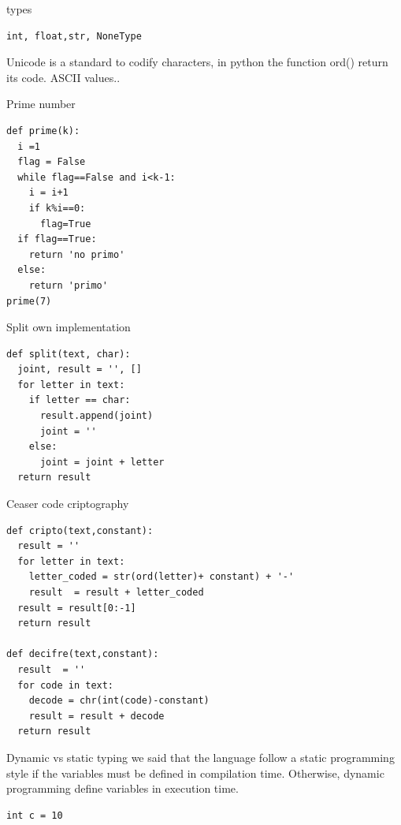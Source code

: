 \documentclass{beamer}
\begin{document}
\begin{frame}[fragile]
types
\begin{lstlisting}
int, float,str, NoneType
\end{lstlisting}
\end{frame}





\begin{frame}{Unicode}
is a standard to codify characters, 
in python the function ord() return its code.
ASCII values..
\end{frame}






\begin{frame}[fragile]{Prime number}
\begin{lstlisting}
def prime(k):
  i =1
  flag = False
  while flag==False and i<k-1:
    i = i+1
    if k%i==0:
      flag=True
  if flag==True:
    return 'no primo'
  else:
    return 'primo'
prime(7)
\end{lstlisting}
\end{frame}


\begin{frame}[fragile]{Split own implementation}
\begin{lstlisting}
def split(text, char):
  joint, result = '', []
  for letter in text:
    if letter == char:
      result.append(joint)
      joint = ''
    else:
      joint = joint + letter
  return result
\end{lstlisting}
\end{frame}






\begin{frame}[fragile]{Ceaser code criptography}
\begin{lstlisting}
def cripto(text,constant):
  result = ''
  for letter in text:
    letter_coded = str(ord(letter)+ constant) + '-'
    result  = result + letter_coded 
  result = result[0:-1]
  return result

def decifre(text,constant):
  result  = ''
  for code in text:
    decode = chr(int(code)-constant)
    result = result + decode
  return result
\end{lstlisting}
\end{frame}



\begin{frame}[fragile]{Dynamic vs static typing}
we said that the language follow a static programming style if the variables must be defined in compilation time. Otherwise, dynamic programming define variables in execution time.

\begin{verbatim}
int c = 10
\end{verbatim}

\end{frame}
\end{document}
